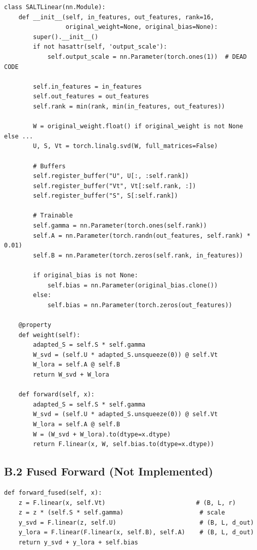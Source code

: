 \begin{lstlisting}
class SALTLinear(nn.Module):
    def __init__(self, in_features, out_features, rank=16,
                 original_weight=None, original_bias=None):
        super().__init__()
        if not hasattr(self, 'output_scale'):
            self.output_scale = nn.Parameter(torch.ones(1))  # DEAD CODE
        
        self.in_features = in_features
        self.out_features = out_features
        self.rank = min(rank, min(in_features, out_features))

        W = original_weight.float() if original_weight is not None else ...
        U, S, Vt = torch.linalg.svd(W, full_matrices=False)
        
        # Buffers
        self.register_buffer("U", U[:, :self.rank])
        self.register_buffer("Vt", Vt[:self.rank, :])
        self.register_buffer("S", S[:self.rank])
        
        # Trainable
        self.gamma = nn.Parameter(torch.ones(self.rank))
        self.A = nn.Parameter(torch.randn(out_features, self.rank) * 0.01)
        self.B = nn.Parameter(torch.zeros(self.rank, in_features))
        
        if original_bias is not None:
            self.bias = nn.Parameter(original_bias.clone())
        else:
            self.bias = nn.Parameter(torch.zeros(out_features))
    
    @property
    def weight(self):
        adapted_S = self.S * self.gamma
        W_svd = (self.U * adapted_S.unsqueeze(0)) @ self.Vt
        W_lora = self.A @ self.B
        return W_svd + W_lora
    
    def forward(self, x):
        adapted_S = self.S * self.gamma
        W_svd = (self.U * adapted_S.unsqueeze(0)) @ self.Vt
        W_lora = self.A @ self.B
        W = (W_svd + W_lora).to(dtype=x.dtype)
        return F.linear(x, W, self.bias.to(dtype=x.dtype))
\end{lstlisting}

\subsection{B.2 Fused Forward (Not Implemented)}

\begin{lstlisting}
def forward_fused(self, x):
    z = F.linear(x, self.Vt)                         # (B, L, r)
    z = z * (self.S * self.gamma)                     # scale
    y_svd = F.linear(z, self.U)                       # (B, L, d_out)
    y_lora = F.linear(F.linear(x, self.B), self.A)    # (B, L, d_out)
    return y_svd + y_lora + self.bias
\end{lstlisting}

